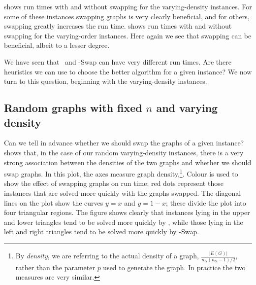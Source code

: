  shows run times with and without swapping
for the varying-density instances.
For some of these instances swapping graphs is very clearly beneficial, and for others,
swapping greatly increases the run time.
 shows run times with and without swapping
for the varying-order instances.  Here again we see that swapping can be beneficial,
albeit to a lesser degree.

We have seen that \McSplit\ and
\McSplit-Swap can have very different run times.  Are there heuristics we can
use to choose the better algorithm for a given instance? We now turn to this
question, beginning with the varying-density instances.

\subsection{Random graphs with fixed $n$ and varying density}

Can we tell in advance whether we should swap the graphs of a given instance?
 shows that, in the case of our
random varying-density instances, there is a very strong association between the densities
of the two graphs and whether we should swap graphs.  In this plot, the axes
measure graph density,\footnote{By \emph{density}, we are referring to the actual density of a graph,
$\frac{|E(G)|}{n_G(n_G-1)/2}$, rather than the parameter $p$ used to generate
the graph. In practice the two measures are very similar.}. Colour is used to show
the effect of swapping graphs on run time; red dots represent those instances
that are solved more quickly with the graphs swapped.  The diagonal lines on the plot
show the curves $y=x$ and $y=1-x$; these divide the plot into four triangular regions.
The figure shows clearly that instances lying
in the upper and lower triangles tend to be solved more quickly by \McSplit, while
those lying in the left and right triangles tend to be solved more
quickly by \McSplit-Swap.

